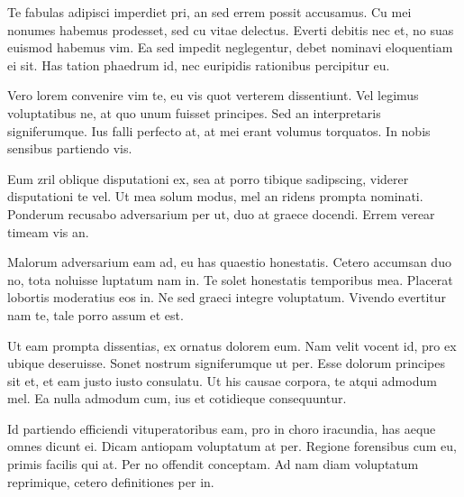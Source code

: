 \documentclass[10pt,]{book}
\begin{document}
Te fabulas adipisci imperdiet pri, an sed errem possit accusamus. Cu mei
nonumes habemus prodesset, sed cu vitae delectus. Everti debitis nec et,
no suas euismod habemus vim. Ea sed impedit neglegentur, debet nominavi
eloquentiam ei sit. Has tation phaedrum id, nec euripidis rationibus
percipitur eu.

Vero lorem convenire vim te, eu vis quot verterem dissentiunt. Vel
legimus voluptatibus ne, at quo unum fuisset principes. Sed an
interpretaris signiferumque. Ius falli perfecto at, at mei erant volumus
torquatos. In nobis sensibus partiendo vis.

Eum zril oblique disputationi ex, sea at porro tibique sadipscing,
viderer disputationi te vel. Ut mea solum modus, mel an ridens prompta
nominati. Ponderum recusabo adversarium per ut, duo at graece docendi.
Errem verear timeam vis an.

Malorum adversarium eam ad, eu has quaestio honestatis. Cetero accumsan
duo no, tota noluisse luptatum nam in. Te solet honestatis temporibus
mea. Placerat lobortis moderatius eos in. Ne sed graeci integre
voluptatum. Vivendo evertitur nam te, tale porro assum et est.

Ut eam prompta dissentias, ex ornatus dolorem eum. Nam velit vocent id,
pro ex ubique deseruisse. Sonet nostrum signiferumque ut per. Esse
dolorum principes sit et, et eam justo iusto consulatu. Ut his causae
corpora, te atqui admodum mel. Ea nulla admodum cum, ius et cotidieque
consequuntur.

Id partiendo efficiendi vituperatoribus eam, pro in choro iracundia, has
aeque omnes dicunt ei. Dicam antiopam voluptatum at per. Regione
forensibus cum eu, primis facilis qui at. Per no offendit conceptam. Ad
nam diam voluptatum reprimique, cetero definitiones per in.
\end{document}
